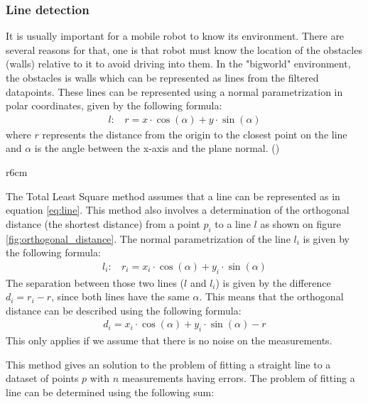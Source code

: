 \documentclass[../Head/Main.tex]{subfiles}
\begin{document}
\subsubsection{Line detection}
It is usually important for a mobile robot to know its environment. There are several reasons for that, one is that robot must know the location of the obstacles (walls) relative to it to avoid driving into them. In the "bigworld" environment, the obstacles is walls which can be represented as lines from the filtered datapoints. These lines can be represented using a normal parametrization in polar coordinates, given by the following formula:
\begin{align}
    l:~~~~r = x\cdot\cos(\alpha)+y\cdot\sin(\alpha)
    \label{eq:line}
\end{align}
where $r$ represents the distance from the origin to the closest point on the line and $\alpha$ is the angle between the x-axis and the plane normal. (\cite{TLSM}) 
\par
\begin{wrapfigure}{r}{6cm}
	\vspace{-12pt}
	\centering
	
	\vspace{-5pt}
	\caption{Orthogonal distance from point $p_1$ to line $l$}
	\label{fig:orthogonal_distance}
	\vspace{-5pt}
\end{wrapfigure}
The Total Least Square method assumes that a line can be represented as in equation \ref{eq:line}. This method also involves a determination of the orthogonal distance (the shortest distance) from a point $p_i$ to a line $l$ as shown on  figure \ref{fig:orthogonal_distance}. The normal parametrization of the line $l_i$ is given by the following formula:
\begin{align}
    l_i:~~~~r_i = x_i\cdot\cos(\alpha)+y_i\cdot\sin(\alpha)
\end{align}
The separation between those two lines ($l$ and $l_i$) is given by the difference $d_i=r_i-r$, since both lines have the same $\alpha$. This means that the orthogonal distance can be described using the following formula:
\begin{align}
    d_i = x_i\cdot\cos(\alpha)+y_i\cdot\sin(\alpha) - r
\end{align}
This only applies if we assume that there is no noise on the measurements. \par
This method gives an solution to the problem of fitting a straight line to a dataset of points $p$ with $n$ measurements having errors. The problem of fitting a line can be determined using the following sum:
\end{document}
